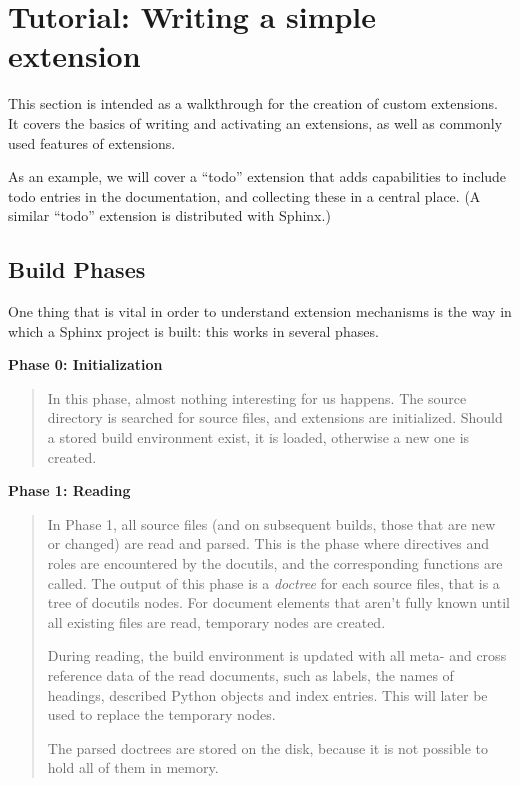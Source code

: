 \documentclass[letterpaper,10pt,english]{sphinxmanual}
\begin{document}
\section{Tutorial: Writing a simple extension}
\label{ext/tutorial::doc}\label{ext/tutorial:exttut}\label{ext/tutorial:tutorial-writing-a-simple-extension}
This section is intended as a walkthrough for the creation of custom extensions.
It covers the basics of writing and activating an extensions, as well as
commonly used features of extensions.

As an example, we will cover a ``todo'' extension that adds capabilities to
include todo entries in the documentation, and collecting these in a central
place.  (A similar ``todo'' extension is distributed with Sphinx.)


\subsection{Build Phases}
\label{ext/tutorial:build-phases}
One thing that is vital in order to understand extension mechanisms is the way
in which a Sphinx project is built: this works in several phases.

\textbf{Phase 0: Initialization}
\begin{quote}

In this phase, almost nothing interesting for us happens.  The source
directory is searched for source files, and extensions are initialized.
Should a stored build environment exist, it is loaded, otherwise a new one is
created.
\end{quote}

\textbf{Phase 1: Reading}
\begin{quote}

In Phase 1, all source files (and on subsequent builds, those that are new or
changed) are read and parsed.  This is the phase where directives and roles
are encountered by the docutils, and the corresponding functions are called.
The output of this phase is a \emph{doctree} for each source files, that is a tree
of docutils nodes.  For document elements that aren't fully known until all
existing files are read, temporary nodes are created.

During reading, the build environment is updated with all meta- and cross
reference data of the read documents, such as labels, the names of headings,
described Python objects and index entries.  This will later be used to
replace the temporary nodes.

The parsed doctrees are stored on the disk, because it is not possible to
hold all of them in memory.
\end{quote}
\end{document}
